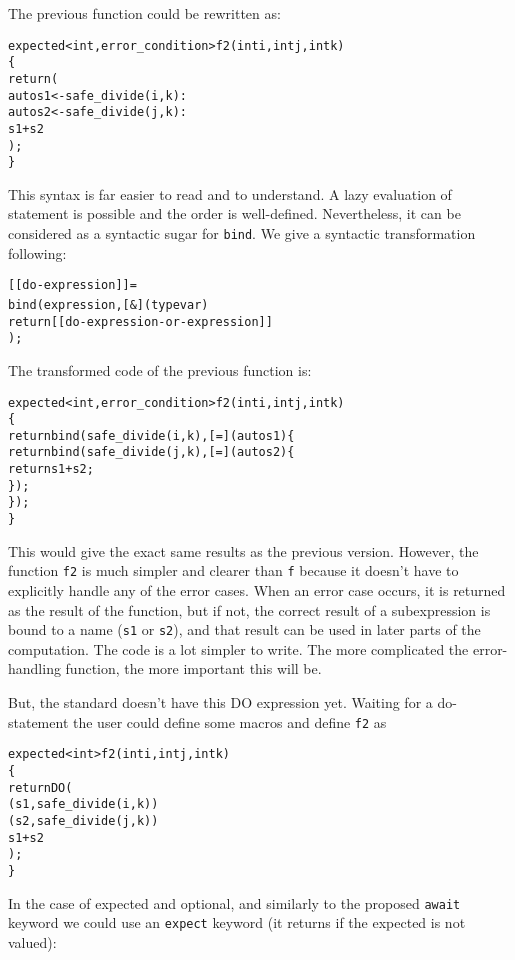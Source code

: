 \documentclass[a4paper,10pt]{article}
\newcommand{\cpp}[1]{\lstinline{#1}}
\begin{document}
\noindent
The previous function could be rewritten as:

\begin{alltt}
expected<int, error_condition> f2(int i, int j, int k)
\{
  return (
    auto s1 <- safe_divide(i, k) :
    auto s2 <- safe_divide(j, k) :
    s1 + s2
  );
\}
\end{alltt}

This syntax is far easier to read and to understand. A lazy evaluation of statement is possible and the order is well-defined. Nevertheless, it can be considered as a syntactic sugar for \cpp{bind}. We give a syntactic transformation following:

\begin{alltt}
[[do-expression]] =
  bind(expression, [&](type var) {
    return [[do-expression-or-expression]]
  });
\end{alltt}
\noindent
The transformed code of the previous function is:

\begin{alltt}
expected<int, error_condition> f2(int i, int j, int k)
\{
  return bind(safe_divide(i, k) ,[=](auto s1) \{
    return bind(safe_divide(j, k),[=](auto s2) \{
      return s1 + s2;
    \});
  \}); 
\}
\end{alltt}

This would give the exact same results as the previous version. However, the function \cpp{f2} is much simpler and clearer than \cpp{f} because it doesn't have to explicitly handle any of the error cases. When an error case occurs, it is returned as the result of the function, but if not, the correct result of a subexpression is bound to a name (\cpp{s1} or \cpp{s2}), and that result can be used in later parts of the computation. The code is a lot simpler to write. The more complicated the error-handling function, the more important this will be.

But, the standard doesn't have this DO expression yet.
Waiting for a do-statement the user could define some macros and define \cpp{f2} as

\begin{alltt}
expected<int> f2(int i, int j, int k)
\{
    return DO (
         ( s1, safe_divide(i, k) )
         ( s2, safe_divide(j, k) )
         s1 + s2 
    );
\}
\end{alltt}

In the case of expected and optional, and similarly to the proposed \cpp{await} keyword we could use an \cpp{expect} keyword (it returns if the expected is not valued):
\end{document}
